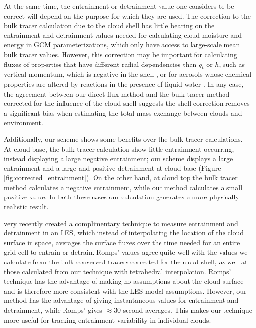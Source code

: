 \documentclass[12pt]{article}
\begin{document}
At the same time, the entrainment or detrainment value one considers to be 
correct will depend on the purpose for which they are used.  The correction to 
the bulk tracer calculation due to the cloud shell has little bearing on the 
entrainment and detrainment values needed for calculating cloud moisture and 
energy in GCM parameterizations, which only have access to large-scale mean 
bulk tracer values.  However, this correction may be important for calculating 
fluxes of properties that have different radial dependencies than $q_t$ or $h$, 
such as vertical momentum, which is negative in the shell \citep{Heus2008}, or 
for aerosols whose chemical properties are altered by reactions in the presence 
of liquid water \citep{Hoppel1994}.  In any case, the agreement between our 
direct flux method and the bulk tracer method corrected for the influence of 
the cloud shell suggests the shell correction removes a significant bias when 
estimating the total mass exchange between clouds and environment.

Additionally, our scheme shows some benefits over the bulk tracer calculations. 
At cloud base, the bulk tracer calculation show little entrainment occurring, 
instead displaying a large negative entrainment; our scheme displays a large 
entrainment and a large and positive detrainment at cloud base (Figure 
\ref{fig:corrected_entrainment}).  On the other hand, at cloud top the bulk 
tracer method calculates a negative entrainment, while our method calculates a 
small positive value.  In both these cases our calculation generates a more 
physically realistic result.  

\cite{Romps2010} very recently created a complimentary technique to measure 
entrainment and detrainment in an LES, which instead of interpolating the 
location of the cloud surface in space, averages the surface fluxes over the 
time needed for an entire grid cell to entrain or detrain.  Romps' values agree 
quite well with the values we calculate from the bulk conserved tracers 
corrected for the cloud shell, as well at those calculated from our technique 
with tetrahedral interpolation.  Romps' technique has the advantage of making 
no assumptions about the cloud surface and is therefore more consistent with 
the LES model assumptions.  However, our method has the advantage of giving 
instantaneous values for entrainment and detrainment, while Romps' gives 
$\approx$30 second averages.  This makes our technique more useful for tracking 
entrainment variability in individual clouds.
\end{document}
